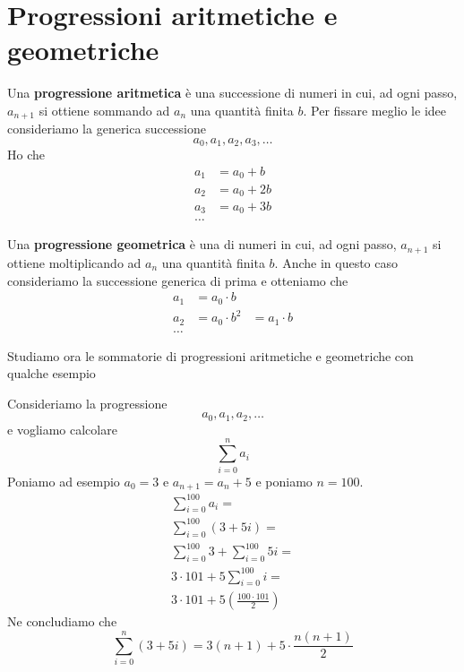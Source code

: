 \section{Progressioni aritmetiche e geometriche}
\begin{defn}
	Una \textbf{progressione aritmetica} \`e una successione di numeri in cui, ad ogni passo,
	$a_{n + 1}$ si ottiene sommando ad $a_n$ una quantit\`a finita $b$.
	Per fissare meglio le idee consideriamo la generica successione
	\begin{equation*}
		a_0, a_1, a_2, a_3, \dots
	\end{equation*}
	Ho che
	\begin{equation*}
		\begin{array}{ll}
			a_1 & = a_0 + b  \\
			a_2 & = a_0 + 2b \\
			a_3 & = a_0 + 3b \\
			\dots
		\end{array}
	\end{equation*}
\end{defn}

\begin{defn}
	Una \textbf{progressione geometrica} \`e una di numeri in cui, ad ogni passo, $a_{n + 1}$
	si ottiene moltiplicando ad $a_n$ una quantit\`a finita $b$.
	Anche in questo caso consideriamo la successione generica di prima e otteniamo che
	\begin{equation*}
		\begin{array}{lll}
			a_1 & = a_0 \cdot b   &               \\
			a_2 & = a_0 \cdot b^2 & = a_1 \cdot b \\
			\dots
		\end{array}
	\end{equation*}
\end{defn}

Studiamo ora le sommatorie di progressioni aritmetiche e geometriche con qualche esempio
\begin{example}
	Consideriamo la progressione
	\begin{equation*}
		a_0, a_1, a_2, \dots
	\end{equation*}
	e vogliamo calcolare
	\begin{equation*}
		\sum_{i = 0}^n a_i
	\end{equation*}
	Poniamo ad esempio $a_0 = 3$ e $a_{n + 1} = a_n + 5$ e poniamo $n = 100$.
	\begin{gather*}
		\sum_{i = 0}^{100} a_i                        = \\
		\sum_{i = 0}^{100} (3 + 5i)                   = \\
		\sum_{i = 0}^{100} 3 + \sum_{i = 0}^{100} 5i  = \\
		3 \cdot 101 + 5 \sum_{i = 0}^{100} i          = \\
		3 \cdot 101 + 5 \left( \frac{100 \cdot 101}{2} \right)
	\end{gather*}
	Ne concludiamo che
	\begin{equation*}
		\sum_{i = 0}^n (3 + 5i) = 3(n + 1) + 5 \cdot \frac{n(n + 1)}{2}
	\end{equation*}
\end{example}

